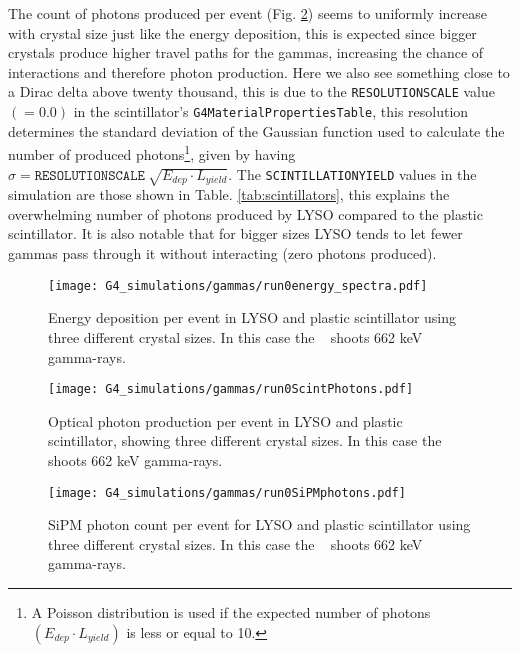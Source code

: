 The count of photons produced per event (Fig. \ref{fig:LYSO_ScintPhotons}) seems to uniformly increase with crystal size just like the energy deposition, this is expected since bigger crystals produce higher travel paths for the gammas, increasing the chance of interactions and therefore photon production. Here we also see something close to a Dirac delta above twenty thousand, this is due to the \texttt{RESOLUTIONSCALE} value $(=0.0)$ in the scintillator's \texttt{G4MaterialPropertiesTable}, this resolution determines the standard deviation of the Gaussian function used to calculate the number of produced photons\footnote{A Poisson distribution is used if the expected number of photons $(E_{dep}\cdot L_{yield})$ is less or equal to 10.}, given by having $\sigma=\texttt{RESOLUTIONSCALE}~\sqrt{E_{dep}\cdot L_{yield}}$. The \texttt{SCINTILLATIONYIELD} values in the simulation are those shown in Table. \ref{tab:scintillators}, this explains the overwhelming number of photons produced by LYSO compared to the plastic scintillator. It is also notable that for bigger sizes LYSO tends to let fewer gammas pass through it without interacting (zero photons produced).

\begin{figure}
  \centering
  \texttt{[image: G4\_simulations/gammas/run0energy\_spectra.pdf]}
  \caption{\label{fig:LYSO_edep}Energy deposition per event in LYSO and plastic scintillator using three different crystal sizes. In this case the \gps~ shoots 662 \unit{\kilo\eV} gamma-rays.}
\end{figure}

\begin{figure}
  \centering
  \texttt{[image: G4\_simulations/gammas/run0ScintPhotons.pdf]}
  \caption{\label{fig:LYSO_ScintPhotons}Optical photon production per event in LYSO and plastic scintillator, showing three different crystal sizes. In this case the \gps~ shoots 662 \unit{\kilo\eV} gamma-rays.}
\end{figure}

\begin{figure}
  \centering
  \texttt{[image: G4\_simulations/gammas/run0SiPMphotons.pdf]}
  \caption{\label{fig:LYSO_SiPMPhotons}SiPM photon count per event for LYSO and plastic scintillator using three different crystal sizes. In this case the \gps~ shoots 662 \unit{\kilo\eV} gamma-rays.}
\end{figure}

